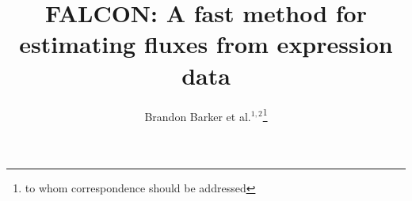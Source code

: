 \documentclass{bioinfo}
\begin{document}





\title[FALCON]{FALCON: A fast method for estimating fluxes
  from expression data}
    \author[Barker \textit{et~al.}]{Brandon Barker et al.$^{1,2}$\footnote{to whom correspondence should be addressed}}

\address{$^{1}$Tri-Institutional Training Program in Computational
  Biology and Medicine, 1300 York Avenue, Box 194, New York, NY 10065\\
  $^{2}$Department of Biological Statistics and Computational Biology, 
    Cornell University, 1198 Comstock Hall, Ithaca, NY 14853-2601\\
  }


\maketitle
\end{document}
